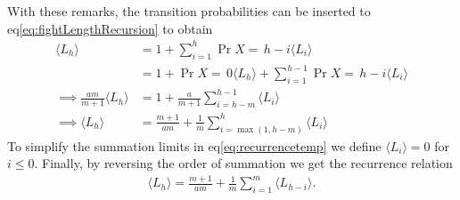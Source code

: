 With these remarks, the transition probabilities can be inserted to eq\ref{eq:fightLengthRecursion} to obtain
\begin{align}
	\langle L_h \rangle
		&= 1 + \sum_{i=1}^h \Pr{X=\,h-i}\langle L_i \rangle\nonumber\\
		&= 1 + \Pr{X=\,0}\langle L_h \rangle + \sum_{i=1}^{h-1} \Pr{X=\,h-i}\langle L_i \rangle\nonumber\\
	\implies \frac{am}{m+1}\langle L_h \rangle
		&= 1 + \frac{a}{m+1}\sum_{i=h-m}^{h-1} \langle L_i \rangle\nonumber\\
	\implies \langle L_h \rangle
		&= \frac{m+1}{am} + \frac{1}{m}\sum_{i=\max(1,h-m)}^h \langle L_i \rangle\label{eq:recurrencetemp}
\end{align}
To simplify the summation limits in eq\ref{eq:recurrencetemp} we define $\langle L_i \rangle = 0$ for $i \leq 0$. Finally, by reversing the order of summation we get the recurrence relation
\begin{align}
	\boxed{\langle L_h \rangle
		= \frac{m+1}{am} + \frac{1}{m}\sum_{i=1}^m \langle L_{h-i} \rangle
	}\label{eq:noregenRecursion}.
\end{align}
